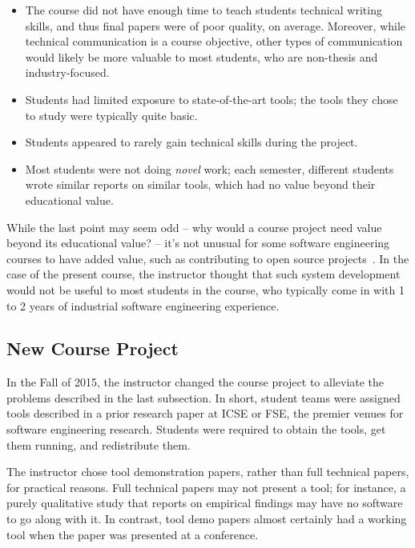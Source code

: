 \documentclass[10pt,conference]{IEEEtran}
\begin{document}
\begin{itemize}  
  \item The course did not have enough time to teach students
  		technical writing skills, and thus final papers were 
  		of poor quality, on average. Moreover, while technical
  		communication is a course objective, other types of
  		communication would likely be more valuable to most
  		students, who are non-thesis and industry-focused.   		 
  \item Students had limited exposure to state-of-the-art
  		tools; the tools they chose to study were typically
  		quite basic.
  \item Students appeared to rarely gain technical skills 
  		during the project.  
  \item Most students were not doing \emph{novel} work; each semester,
  		different students wrote similar reports on similar tools,
  		which had no value beyond their educational value. 
\end{itemize}

While the last point may seem odd -- why would a course project need
value beyond its educational value? -- it's not unusual for 
some software engineering courses to have added value,
such as contributing to open source projects~\cite{pedroni2007open,meneely2008rose}.
In the case of the present course, the instructor thought 
that such system development would not be useful to most students
in the course, who typically come in with 1 to 2 years of 
industrial software engineering experience. 

\subsection{New Course Project}\label{sec:thisProj}

In the Fall of 2015, the instructor changed the course project
to alleviate the problems described in the last subsection.
In short, student teams were assigned tools described in a 
prior research paper at ICSE or FSE, the premier 
venues for software engineering research.
Students were required to obtain the tools, get them running,
and redistribute them.

The instructor chose tool demonstration papers, rather than
full technical papers, for practical reasons.
Full technical papers may not present a tool; for 
instance, a purely qualitative study that reports on 
empirical findings may have no software to go along with it.
In contrast, tool demo papers almost certainly had a working
tool when the paper was presented at a conference. 
\end{document}
